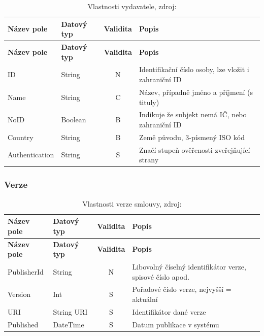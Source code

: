 \begin{center}
\begin{longtable}{lp{20mm}cp{65mm}}
\label{grid_mlmmh} \\
\multicolumn{1}{l}{\textbf{Název pole}} & 
\multicolumn{1}{l}{\textbf{Datový typ}} & 
\multicolumn{1}{l}{\textbf{Validita}} & 
\multicolumn{1}{l}{\textbf{Popis}} \\ \hline 
\endfirsthead
\multicolumn{1}{l}{\textbf{Název pole}} & 
\multicolumn{1}{l}{\textbf{Datový typ}} & 
\multicolumn{1}{l}{\textbf{Validita}} & 
\multicolumn{1}{l}{\textbf{Popis}} \\ \hline 
\hline
\endhead
\endfoot
\caption[Vlastnosti vydavatele]{Vlastnosti vydavatele, zdroj:\cite{metodika, standard}}
\endlastfoot
ID & String & N & Identifikační číslo osoby, lze vložit i zahraniční ID \\
\rowcolor{validateC}Name & String & C & Název, případně jméno a příjmení (s tituly) \\
\rowcolor{validateB}NoID & Boolean & B & Indikuje že subjekt nemá IČ, nebo zahraniční ID \\
\rowcolor{validateB}Country & String & B & Země původu, 3-písmený ISO kód \\
\rowcolor{validateS}Authentication & String & S & Značí stupeň ověřenosti zveřejňující strany \\
\end{longtable}
\end{center}

\newpage

\subsubsection*{Verze}

\begin{center}
\begin{longtable}{lp{20mm}cp{65mm}}
\label{grid_mlmmh} \\
\multicolumn{1}{l}{\textbf{Název pole}} & 
\multicolumn{1}{l}{\textbf{Datový typ}} & 
\multicolumn{1}{l}{\textbf{Validita}} & 
\multicolumn{1}{l}{\textbf{Popis}} \\ \hline 
\endfirsthead
\multicolumn{1}{l}{\textbf{Název pole}} & 
\multicolumn{1}{l}{\textbf{Datový typ}} & 
\multicolumn{1}{l}{\textbf{Validita}} & 
\multicolumn{1}{l}{\textbf{Popis}} \\ \hline 
\hline
\endhead
\endfoot
\caption[Vlastnosti verze smlouvy]{Vlastnosti verze smlouvy, zdroj:\cite{metodika, standard}}
\endlastfoot
PublisherId & String & N & Libovolný číselný identifikátor verze, spisové číslo apod. \\
\rowcolor{validateS}Version & Int & S & Pořadové číslo verze, nejvyšší = aktuální \\
\rowcolor{validateS}URI & String URI & S & Identifikátor dané verze \\
\rowcolor{validateS}Published & DateTime & S & Datum publikace v systému \\
\end{longtable}
\end{center}

